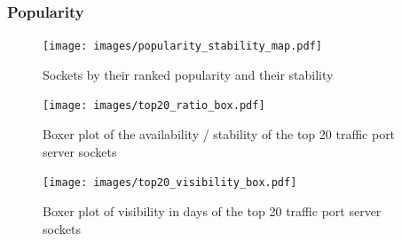 \subsubsection{Popularity}
\begin{figure}
	[ht] \centering 
	\texttt{[image: images/popularity\_stability\_map.pdf]}
	\caption{Sockets by their ranked popularity and their stability} 
	\label{fig:rankedPopularity} 
\end{figure}


\begin{landscape}
\begin{figure}
	[ht] \centering 
	\texttt{[image: images/top20\_ratio\_box.pdf]}
	\caption{Boxer plot of the availability / stability of the top 20 traffic port server sockets} 
	\label{fig:top20_ratio_box} 
\end{figure}
\end{landscape}

\begin{landscape}
\begin{figure}
	[ht] \centering 
	\texttt{[image: images/top20\_visibility\_box.pdf]}
	\caption{Boxer plot of visibility in days of the top 20 traffic port server sockets}
	\label{fig:top20_visibledays_box}
\end{figure}
\end{landscape}


